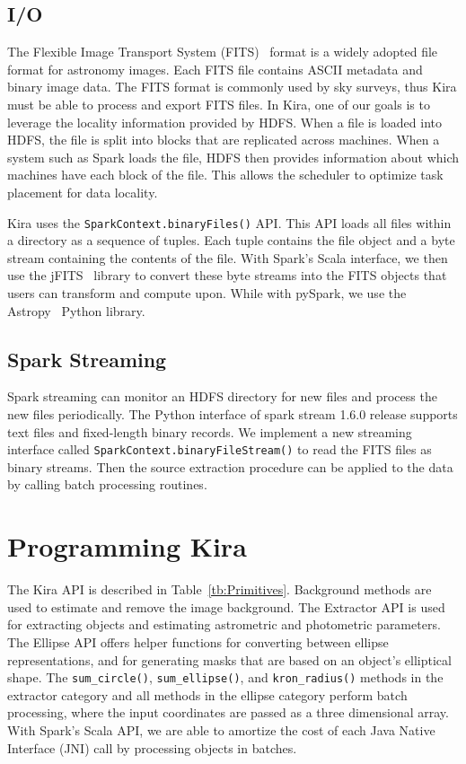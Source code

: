 \documentclass[10pt,journal,compsoc]{IEEEtran}
\begin{document}
\subsection{I/O}
\label{sec:Design-I/O}
The Flexible Image Transport System (FITS)~\cite{wells81} format is a widely adopted file format for astronomy
images. Each FITS file contains ASCII metadata and binary image data.
The FITS format is commonly used by sky surveys, thus Kira must be able to process and export FITS files.
In Kira, one of our goals is to leverage the locality information provided by HDFS. When a file is loaded into 
HDFS, the file is split into blocks that are replicated across machines. When a system such as Spark loads the file, 
HDFS then provides information about which machines have each block of the file. This allows the
scheduler to optimize task placement for data locality.


Kira uses the \texttt{SparkContext.binaryFiles()} API.
This API loads all files within a directory as a sequence of tuples. 
Each tuple contains the file object and a byte stream containing the contents of the file. 
With Spark's Scala interface, we then use the jFITS~\cite{jfits} library to convert these byte streams 
into the FITS objects that users can transform and compute upon. 
While with pySpark, we use the Astropy~\cite{astropy13} Python library.

\subsection{Spark Streaming}
\label{sec:Design-Streaming}
Spark streaming can monitor an HDFS directory for new files and process the new files periodically. 
The Python interface of spark stream 1.6.0 release supports text files and fixed-length binary records.
We implement a new streaming interface called \texttt{SparkContext.binaryFileStream()} to read the FITS
files as binary streams. 
Then the source extraction procedure can be applied to the data by calling batch processing routines.

\section{Programming Kira}
\label{sec:Programming}
The Kira API is described in Table~\ref{tb:Primitives}. 
Background methods are used to estimate and remove the image background. The Extractor
API is used for extracting objects and estimating astrometric and photometric parameters. The Ellipse API offers helper
functions for converting between ellipse representations, and for generating masks that are based on an object's elliptical
shape. The \texttt{sum\_circle()}, \texttt{sum\_ellipse()}, and \texttt{kron\_radius()} methods in the extractor category and all
methods in the ellipse category perform batch processing, where the input coordinates are passed as a three dimensional array. 
With Spark's Scala API, we are able to amortize the cost of each Java Native Interface (JNI) call  by processing objects in batches.
\end{document}
